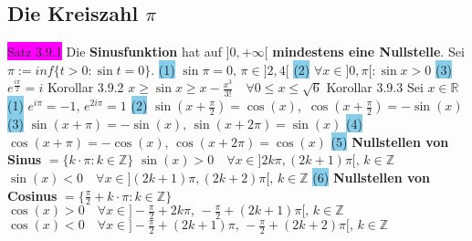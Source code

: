 \documentclass[landscape, 10pt]{article}
\newcommand{\R}{\mathbb{R}}
\begin{document}
\begin{multicols}{3}
       \subsection{Die Kreiszahl $\pi$}
              \colorbox{magenta}{Satz 3.9.1} Die \textbf{Sinusfunktion} hat auf 
                     \textcolor{NavyBlue}{$]0,+\infty[$}
                     \textbf{mindestens eine Nullstelle}. Sei 
                     \textcolor{NavyBlue}{$\pi:=inf\{t>0:\sin t=0\}$}.
                     \colorbox{SkyBlue}{(1)} \textcolor{NavyBlue}{$\sin\pi=0,\,\pi\in]2,4[$} 
                     \qquad\qquad
                     \colorbox{SkyBlue}{(2)} \textcolor{NavyBlue}{$\forall x\in]0,\pi[:\sin x>0$}
                     \qquad\qquad
                     \colorbox{SkyBlue}{(3)} \textcolor{NavyBlue}{$e^{\frac{i\pi}{2}}=i$}
              \colorbox{BurntOrange}{Korollar 3.9.2} \textcolor{NavyBlue}{
                     $x\geqslant\sin x\geqslant x-\frac{x^3}{3!}\quad
                     \forall0\leqslant x\leqslant\sqrt{6}$}
              \colorbox{BurntOrange}{Korollar 3.9.3} Sei \textcolor{NavyBlue}{$x\in\R$}
                     \colorbox{SkyBlue}{(1)} \textcolor{NavyBlue}{$e^{i\pi}=-1,\,e^{2i\pi}=1$} 
                     \colorbox{SkyBlue}{(2)} 
                     \textcolor{NavyBlue}{$\sin(x+\frac{\pi}{2})=\cos(x)$},\,
                     \textcolor{NavyBlue}{$\cos(x+\frac{\pi}{2})=-\sin(x)$} 
                     \colorbox{SkyBlue}{(3)} 
                     \textcolor{NavyBlue}{$\sin(x+\pi)=-\sin(x),\,\sin(x+2\pi)=\sin(x)$}
                     \colorbox{SkyBlue}{(4)}
                     \textcolor{NavyBlue}{$\cos(x+\pi)=-\cos(x),\,\cos(x+2\pi)=\cos(x)$}
                     \colorbox{SkyBlue}{(5)} \textbf{Nullstellen von Sinus} 
                     \textcolor{NavyBlue}{$=\{k\cdot\pi:k\in\mathbb{Z}\}$} \qquad
                     \textcolor{NavyBlue}{
                     $\sin(x)>0\quad\forall x\in]2k\pi,(2k+1)\pi[,\,k\in\mathbb{Z}$}
                     \textcolor{NavyBlue}{
                     $\sin(x)<0\quad\forall x\in](2k+1)\pi,(2k+2)\pi[,\,k\in\mathbb{Z}$} 
                     \colorbox{SkyBlue}{(6)} \textbf{Nullstellen von Cosinus}
                     \textcolor{NavyBlue}{$=\{\frac{\pi}{2}+k\cdot\pi:k\in\mathbb{Z}\}$}
                     \textcolor{NavyBlue}{$\cos(x)>0\quad
                     \forall x\in]-\frac{\pi}{2}+2k\pi,\,-\frac{\pi}{2}+(2k+1)\pi[,\,
                     k\in\mathbb{Z}$} 
                     \textcolor{NavyBlue}{$\cos(x)<0\quad
                     \forall x\in]-\frac{\pi}{2}+(2k+1)\pi,\,-\frac{\pi}{2}+(2k+2)\pi[,\,
                     k\in\mathbb{Z}$}

\end{multicols}
\end{document}
